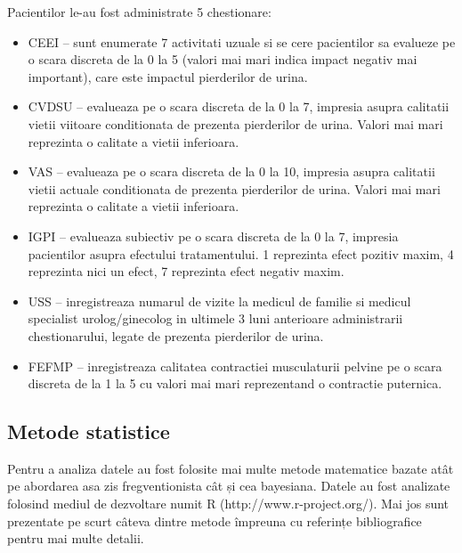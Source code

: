 \documentclass[11pt,draft]{article}
\begin{document}
  Pacientilor le-au fost administrate 5 chestionare:
  \begin{itemize}
    \item \ac{CEEI} -- sunt enumerate 7 activitati uzuale si se cere pacientilor sa evalueze pe o scara discreta de la 0 la 5 (valori mai mari indica impact negativ mai important), care este impactul pierderilor de urina.
    \item \ac{CVDSU} -- evalueaza pe o scara discreta de la 0 la 7, impresia asupra calitatii vietii viitoare conditionata de prezenta pierderilor de urina. Valori mai mari reprezinta o calitate a vietii inferioara.
    \item \ac{VAS} -- evalueaza pe o scara discreta de la 0 la 10, impresia asupra calitatii vietii actuale conditionata de prezenta pierderilor de urina. Valori mai mari reprezinta o calitate a vietii inferioara.
    \item \ac{IGPI} -- evalueaza subiectiv pe o scara discreta de la 0 la 7, impresia pacientilor asupra efectului tratamentului. 1 reprezinta efect pozitiv maxim, 4 reprezinta nici un efect, 7 reprezinta efect negativ maxim.
    \item \ac{USS} -- inregistreaza numarul de vizite la medicul de familie si medicul specialist urolog/ginecolog in ultimele 3 luni anterioare administrarii chestionarului, legate de prezenta pierderilor de urina.
    \item \ac{FEFMP} -- inregistreaza  calitatea contractiei musculaturii pelvine pe o scara discreta de la 1 la 5 cu valori mai mari reprezentand o contractie puternica. 
  \end{itemize}

\subsection{Metode statistice}
  Pentru a analiza datele au fost folosite mai multe metode matematice bazate atât pe abordarea asa zis fregventionista cât și cea bayesiana. Datele au fost analizate folosind mediul de dezvoltare numit R (http://www.r-project.org/). Mai jos sunt prezentate pe scurt câteva dintre metode împreuna cu referințe bibliografice pentru mai multe detalii.
\end{document}
